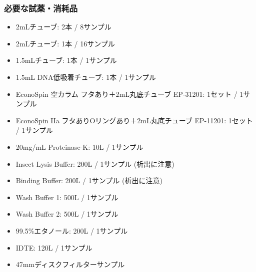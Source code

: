 \documentclass[titlepage,10pt,a4paper,uplatex]{jsbook}
\begin{document}
\subsubsection{必要な試薬・消耗品}
\begin{itemize}
\item 2mLチューブ: 2本 / 8サンプル
\item 2mLチューブ: 1本 / 16サンプル
\item 1.5mLチューブ: 1本 / 1サンプル
\item 1.5mL DNA低吸着チューブ: 1本 / 1サンプル
\item EconoSpin 空カラム フタあり＋2mL丸底チューブ EP-31201: 1セット / 1サンプル
\item EconoSpin IIa フタありOリングあり＋2mL丸底チューブ EP-11201: 1セット / 1サンプル
\item 20mg/mL Proteinase-K: 10{\textmu}L / 1サンプル
\item Insect Lysis Buffer: 200{\textmu}L / 1サンプル (析出に注意)
\item Binding Buffer: 200{\textmu}L / 1サンプル (析出に注意)
\item Wash Buffer 1: 500{\textmu}L / 1サンプル
\item Wash Buffer 2: 500{\textmu}L / 1サンプル
\item 99.5\%エタノール: 200{\textmu}L / 1サンプル
\item IDTE: 120{\textmu}L / 1サンプル
\item 47mmディスクフィルターサンプル
\end{itemize}
\end{document}
